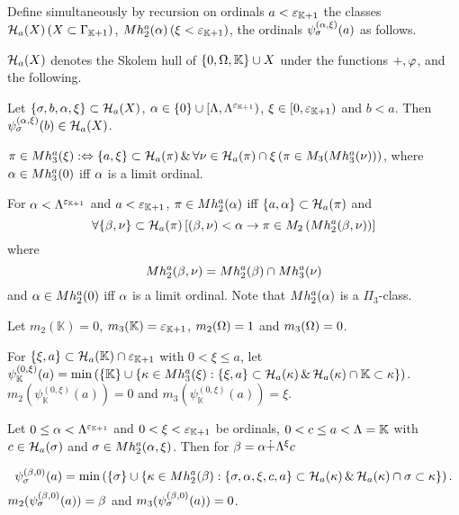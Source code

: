 \documentclass{article}
\newcommand{\mK}{\mathbb{K}}
\begin{document}
\bdf\label{df:HKPpi4}
{\rm
Define simultaneously by recursion on ordinals $a<\veps_{\mK+1}$ the classes
 $\calh_{a}(X)\, (X\subset \Gam_{\mK+1})$, $Mh_{2}^{a}(\alp)\,(\xi<\veps_{\mK+1})$,
  the ordinals $\psi_{\sigma}^{(\alpha,\xi)}(a)$ as follows.


\benu
\item
${\cal H}_{a}(X)$ denotes the Skolem hull of $\{0,\Ome,\mK\}\cup X$ under the functions
$+, \varphi$, 
and the following.

 Let $\{\sigma,b,\alpha,\xi\}\subset{\cal H}_{a}(X)$, $\alp\in\{0\}\cup[\Lam,\Lam^{\veps_{\mK+1}})$, 
 $\xi\in[0,\veps_{\mK+1})$  and 
 $b<a$.
 Then $\psi_{\sigma}^{(\alpha,\xi)}(b)\in{\cal H}_{a}(X)$. 

 
\item
$
\pi\in Mh_{3}^{a}(\xi):\Leftrightarrow
\{a,\xi\}\subset{\cal H}_{a}(\pi) \,\&\,
\forall\nu\in{\cal H}_{a}(\pi)\cap\xi\left(
\pi\in M_{3}(Mh_{3}^{a}(\nu))
\right)
$,
where $\alpha\in Mh_{3}^{a}(0)$ iff $\alpha$ is a limit ordinal.

\item
For $\alp<\Lam^{\veps_{\mK+1}}$ and $a<\veps_{\mK+1}$,
$\pi\in Mh_{2}^{a}(\alpha)$ iff $\{a,\alpha\}\subset{\cal H}_{a}(\pi)$ and
\[
\forall\{\beta,\nu\}\subset{\cal H}_{a}(\pi)
\left[
(\beta,\nu)<\alpha \to
\pi\in M_{2}\left(
Mh_{2}^{a}(\beta,\nu)
\right)
\right]
\]
where
\[
Mh_{2}^{a}(\beta,\nu)=Mh_{2}^{a}(\beta)\cap Mh_{3}^{a}(\nu)
\]
and $\alpha\in Mh_{2}^{a}(0)$ iff $\alpha$ is a limit ordinal.
Note that $Mh_{2}^{a}(\alpha)$ is a $\Pi_{3}$-class.


\item
Let $m_{2}(\mK)=0$, $m_{3}(\mK)=\veps_{\mK+1}$, $m_{2}(\Omega)=1$ and $m_{3}(\Omega)=0$.
 \benu
\item 
For $\{\xi,a\}\subset\calh_{a}(\mK)\cap\veps_{\mK+1}$ with $0<\xi\leq a$, let
\\
$\psi_{\mK}^{(0,\xi)}(a)=
\min\left(\{\mK\}\cup
\{\kap\in Mh_{3}^{a}(\xi): \{\xi,a\}\subset\calh_{a}(\kap) \spand
\calh_{a}(\kap)\cap\mK\subset\kap\}
\right)$.
$m_{2}(\psi_{\mK}^{(0,\xi)}(a))=0$ and $m_{3}(\psi_{\mK}^{(0,\xi)}(a))=\xi$.


 \item
Let
$0\leq\alp< \Lam^{\veps_{\mK+1}}$ and $0<\xi<\veps_{\mK+1}$
be ordinals, 
$0<c\leq a<\Lam=\mK$ with $c\in{\cal H}_{a}(\sigma)$
and
$\sigma\in Mh_{2}^{a}(\alpha,\xi)$.
Then for $\beta=\alpha\dot{+}\Lambda^{\xi}c$

\[
\psi_{\sigma}^{(\beta,0)}(a)=\min\left(\{\sigma\}\cup
\{\kappa\in Mh_{2}^{a}(\beta): \{\sigma,\alpha,\xi,c,a\}\subset{\cal H}_{a}(\kappa) \,\&\,
{\cal H}_{a}(\kappa)\cap\sigma\subset\kappa\}
\right).
\]
$m_{2}(\psi_{\sigma}^{(\beta,0)}(a))=\beta$ and $m_{3}(\psi_{\sigma}^{(\beta,0)}(a))=0$.

}
\end{document}
